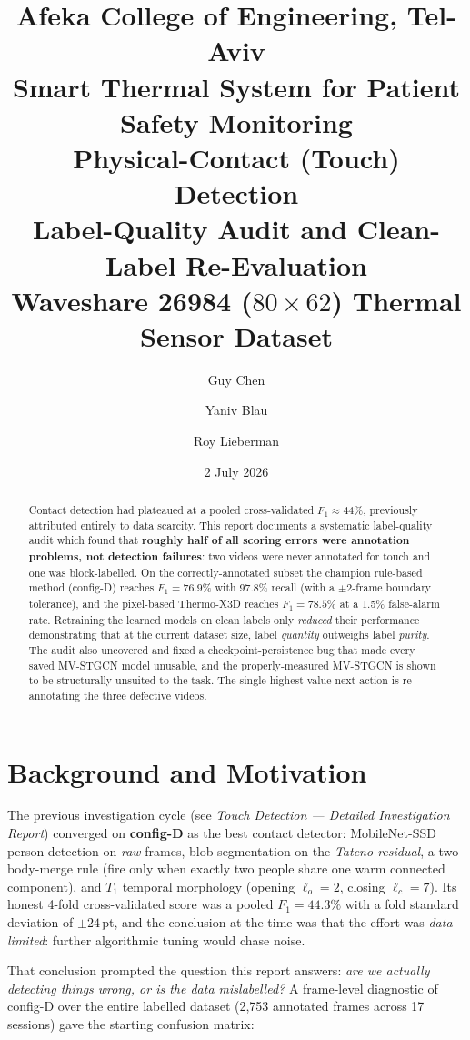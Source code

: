 \documentclass[11pt, a4paper]{article}
\title{%
    {\large Afeka College of Engineering, Tel-Aviv}\\[0.3em]
    {\large Smart Thermal System for Patient Safety Monitoring}\\[0.7em]
    {\LARGE\bfseries Physical-Contact (Touch) Detection}\\[0.2em]
    {\large Label-Quality Audit and Clean-Label Re-Evaluation}\\[0.3em]
    {\normalsize Waveshare 26984 ($80\times62$) Thermal Sensor Dataset}}
\author{Guy Chen \and Yaniv Blau \and Roy Lieberman}
\date{2 July 2026}
\begin{document}
\maketitle

\begin{abstract}
\noindent
Contact detection had plateaued at a pooled cross-validated $F_1\approx44\%$, previously
attributed entirely to data scarcity. This report documents a systematic label-quality
audit which found that \textbf{roughly half of all scoring errors were annotation
problems, not detection failures}: two videos were never annotated for touch and one was
block-labelled. On the correctly-annotated subset the champion rule-based method
(config-D) reaches \textbf{$F_1=76.9\%$} with 97.8\% recall (with a $\pm2$-frame boundary
tolerance), and the pixel-based Thermo-X3D reaches \textbf{$F_1=78.5\%$} at a 1.5\% false-alarm
rate. Retraining the learned models on clean labels only \emph{reduced} their performance
--- demonstrating that at the current dataset size, label \emph{quantity} outweighs label
\emph{purity}. The audit also uncovered and fixed a checkpoint-persistence bug that made
every saved MV-STGCN model unusable, and the properly-measured MV-STGCN is shown to be
structurally unsuited to the task. The single highest-value next action is re-annotating
the three defective videos.
\end{abstract}

\tableofcontents
\clearpage

\section{Background and Motivation}

The previous investigation cycle (see \emph{Touch Detection --- Detailed Investigation
Report}) converged on \textbf{config-D} as the best contact detector: MobileNet-SSD person
detection on \emph{raw} frames, blob segmentation on the \emph{Tateno residual}, a
two-body-merge rule (fire only when exactly two people share one warm connected
component), and $T_1$ temporal morphology (opening $\ell_o=2$, closing $\ell_c=7$).
Its honest 4-fold cross-validated score was a pooled $F_1=44.3\%$ with a fold standard
deviation of $\pm24$\,pt, and the conclusion at the time was that the effort was
\emph{data-limited}: further algorithmic tuning would chase noise.

That conclusion prompted the question this report answers: \emph{are we actually
detecting things wrong, or is the data mislabelled?} A frame-level diagnostic of config-D
over the entire labelled dataset (2{,}753 annotated frames across 17 sessions) gave the
starting confusion matrix:
\end{document}
